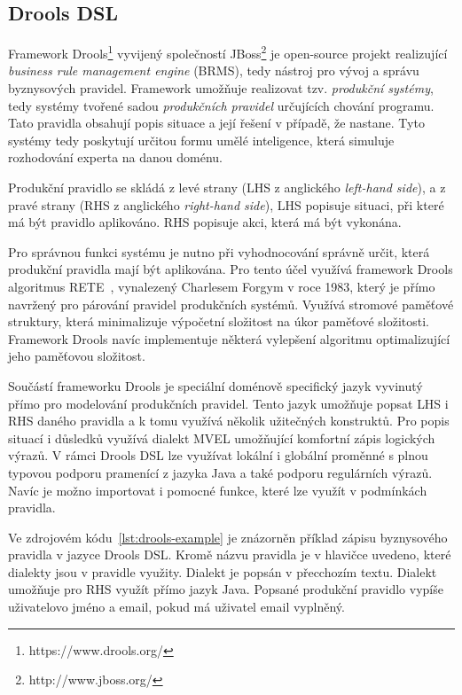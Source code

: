 \subsection{Drools DSL}

Framework Drools\footnote{https://www.drools.org/} vyvijený společností JBoss\footnote{http://www.jboss.org/}
je open-source projekt realizující \textit{business rule management engine} (\gls{BRMS}),
tedy nástroj pro vývoj a správu byznysových pravidel. Framework umožňuje realizovat
tzv. \textit{produkční systémy}, tedy systémy tvořené sadou \textit{produkčních pravidel}
určujících chování programu. Tato pravidla obsahují popis situace a její řešení v případě,
že nastane. Tyto systémy tedy poskytují určitou formu umělé inteligence, která simuluje
rozhodování experta na danou doménu.

Produkční pravidlo se skládá z levé strany (\gls{LHS} z anglického \textit{left-hand side}),
a z pravé strany (\gls{RHS} z anglického \textit{right-hand side}),
\gls{LHS} popisuje situaci, při které má být pravidlo aplikováno. \gls{RHS} popisuje akci,
která má být vykonána.

Pro správnou funkci systému je nutno při vyhodnocování správně určit, která produkční pravidla
mají být aplikována. Pro tento účel využívá framework Drools algoritmus RETE~\cite{forgy1988rete},
vynalezený Charlesem Forgym v roce 1983, který je přímo navržený pro párování pravidel produkčních systémů.
Využívá stromové paměťové struktury, která minimalizuje výpočetní složitost na úkor paměťové složitosti. Framework
Drools navíc implementuje některá vylepšení algoritmu optimalizující jeho paměťovou složitost.

Součástí frameworku Drools je speciální doménově specifický jazyk vyvinutý přímo
pro modelování produkčních pravidel. Tento jazyk umožňuje popsat \gls{LHS} i \gls{RHS}
daného pravidla a k tomu využívá několik užitečných konstruktů. Pro popis situací i důsledků
využívá dialekt MVEL umožňující komfortní zápis logických výrazů. V rámci Drools \gls{DSL}
lze využívat lokální i globální proměnné s plnou typovou podporu pramenící z jazyka Java a také
podporu regulárních výrazů. Navíc je možno importovat i pomocné funkce, které lze
využít v podmínkách pravidla.

Ve zdrojovém kódu~\ref{lst:drools-example} je znázorněn příklad zápisu
byznysového pravidla v jazyce Drools DSL. Kromě názvu pravidla je v hlavičce
uvedeno, které dialekty jsou v pravidle využity. Dialekt  je popsán v přecchozím textu.
Dialekt  umožňuje pro \gls{RHS} využít přímo jazyk Java. Popsané produkční pravidlo
vypíše uživatelovo jméno a email, pokud má uživatel email vyplněný.

